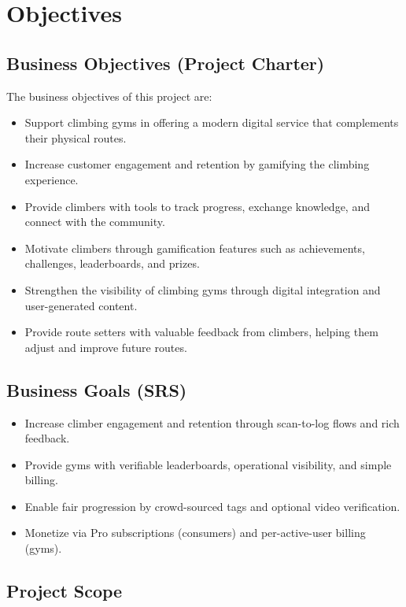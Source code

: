 \documentclass[12pt,a4paper]{report}
\renewcommand\_{\textunderscore\hspace{0pt}}
\begin{document}
\section{Objectives}

\subsection{Business Objectives (Project Charter)}

The business objectives of this project are:

\begin{itemize}[noitemsep]
    \item Support climbing gyms in offering a modern digital service that complements their physical routes.
    \item Increase customer engagement and retention by gamifying the climbing experience.
    \item Provide climbers with tools to track progress, exchange knowledge, and connect with the community.
    \item Motivate climbers through gamification features such as achievements, challenges, leaderboards, and prizes.
    \item Strengthen the visibility of climbing gyms through digital integration and user-generated content.
    \item Provide route setters with valuable feedback from climbers, helping them adjust and improve future routes.
\end{itemize}

\subsection{Business Goals (SRS)}

\begin{itemize}[noitemsep]
    \item Increase climber engagement and retention through scan-to-log flows and rich feedback.
    \item Provide gyms with verifiable leaderboards, operational visibility, and simple billing.
    \item Enable fair progression by crowd-sourced tags and optional video verification.
    \item Monetize via Pro subscriptions (consumers) and per-active-user billing (gyms).
\end{itemize}

\subsection{Project Scope}
\end{document}
